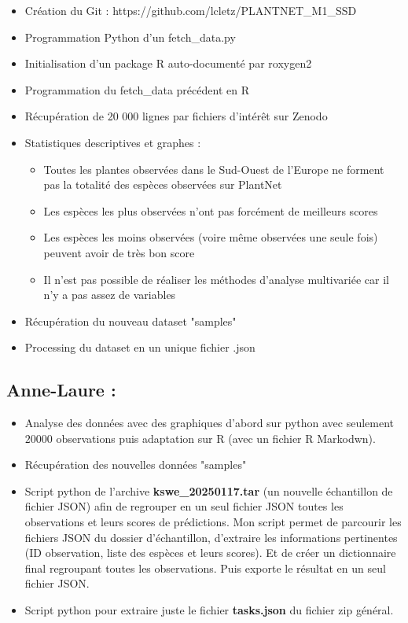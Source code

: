 \documentclass[french]{article}
\begin{document}
\begin{itemize}
    \item Création du Git : https://github.com/lcletz/PLANTNET\_M1\_SSD
    \item Programmation Python d'un fetch\_data.py
    \item Initialisation d'un package R auto-documenté par roxygen2
    \item Programmation du fetch\_data précédent en R 
    \item Récupération de 20 000 lignes par fichiers d'intérêt sur Zenodo
    \item Statistiques descriptives et graphes : 
    \begin{itemize}
        \item Toutes les plantes observées dans le Sud-Ouest de l'Europe ne forment pas la totalité des espèces observées sur PlantNet
        \item Les espèces les plus observées n'ont pas forcément de meilleurs scores 
        \item Les espèces les moins observées (voire même observées une seule fois) peuvent avoir de très bon score
        \item Il n'est pas possible de réaliser les méthodes d'analyse multivariée car il n'y a pas assez de variables
    \end{itemize}
    \item Récupération du nouveau dataset "samples"
    \item Processing du dataset en un unique fichier .json
\end{itemize}

\subsection{Anne-Laure :}

\begin{itemize}
    \item Analyse des données avec des graphiques d'abord sur python avec seulement $20 000$ observations puis adaptation sur R (avec un fichier R Markodwn).
    \item Récupération des nouvelles données "samples"
    \item Script python de l'archive \textbf{kswe\_20250117.tar} (un nouvelle échantillon de fichier JSON) afin de regrouper en un seul fichier JSON toutes les observations et leurs scores de prédictions. Mon script permet de parcourir les fichiers JSON du dossier d’échantillon, d'extraire les informations pertinentes (ID observation, liste des espèces et leurs scores). Et de créer un dictionnaire final regroupant toutes les observations. Puis exporte le résultat en un seul fichier JSON.
    \item Script python pour extraire juste le fichier \textbf{tasks.json} du fichier zip général.
\end{itemize}
\end{document}
